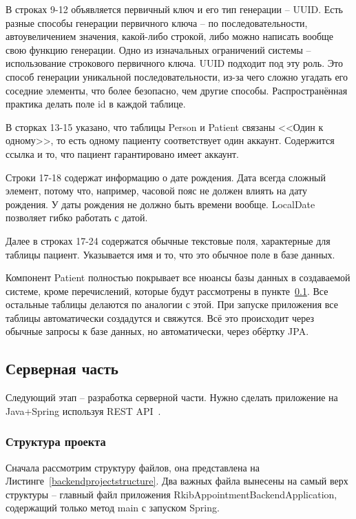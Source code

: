 \documentclass[a4paper,article]{article}
\begin{document}
\begin{sloppypar}
    В строках 9-12 объявляется первичный ключ и его тип генерации -- UUID. Есть разные способы генерации первичного ключа -- по последовательности, автоувеличением значения, какой-либо строкой, либо можно написать вообще свою функцию генерации. Одно из изначальных ограничений системы -- использование строкового первичного ключа. UUID подходит под эту роль. Это способ генерации уникальной последовательности, из-за чего сложно угадать его соседние элементы, что более безопасно, чем другие способы. Распространённая практика делать поле id в каждой таблице.

    В сторках 13-15 указано, что таблицы Person и Patient связаны <<Один к одному>>, то есть одному пациенту соответствует один аккаунт. Содержится ссылка и то, что пациент гарантировано имеет аккаунт.

    Строки 17-18 содержат информацию о дате рождения. Дата всегда сложный элемент, потому что, например, часовой пояс не должен влиять на дату рождения. У даты рождения не должно быть времени вообще. LocalDate позволяет гибко работать с датой.

    Далее в строках 17-24 содержатся обычные текстовые поля, характерные для таблицы пациент. Указывается имя и то, что это обычное поле в базе данных.

    Компонент Patient полностью покрывает все нюансы базы данных в создаваемой системе, кроме перечислений, которые будут рассмотрены в пункте~\ref{Реализация. Серверная часть}. Все остальные таблицы делаются по аналогии с этой. При запуске приложения все таблицы автоматически создадутся и свяжутся. Всё это происходит через обычные запросы к базе данных, но автоматически, через обёртку JPA.

    \subsection{Серверная часть}\label{Реализация. Серверная часть}

    Следующий этап -- разработка серверной части. Нужно сделать приложение на Java+Spring используя REST API~\cite{springguide, webapi}.

    \subsubsection{Структура проекта}

    Сначала рассмотрим структуру файлов, она представлена на Листинге~\ref{backendprojectstructure}. Два важных файла вынесены на самый верх структуры -- главный файл приложения RkibAppointmentBackendApplication, содержащий только метод main с запуском Spring.


\end{sloppypar}
\end{document}

